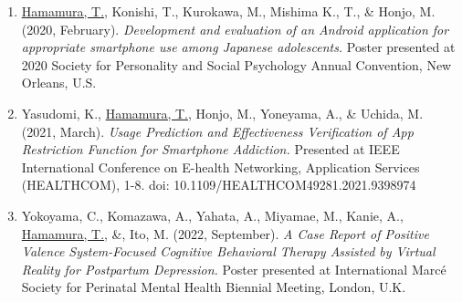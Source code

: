 \documentclass[11pt,a4paper]{article}
\begin{document}
\begin{enumerate}
	\item \underline{Hamamura, T.}, Konishi, T., Kurokawa, M., Mishima K., T., \& Honjo, M. (2020, February). \textit{Development and evaluation of an Android application for appropriate smartphone use among Japanese adolescents.} Poster presented at 2020 Society for Personality and Social Psychology Annual Convention, New Orleans, U.S.
	\item Yasudomi, K., \underline{Hamamura, T.}, Honjo, M., Yoneyama, A., \& Uchida, M. (2021, March). \textit{Usage Prediction and Effectiveness Verification of App Restriction Function for Smartphone Addiction.} Presented at IEEE International Conference on E-health Networking, Application Services (HEALTHCOM), 1-8. doi: 10.1109/HEALTHCOM49281.2021.9398974
	\item Yokoyama, C., Komazawa, A., Yahata, A., Miyamae, M., Kanie, A., \underline{Hamamura, T.}, \&, Ito, M. (2022, September). \textit{A Case Report of Positive Valence System-Focused Cognitive Behavioral Therapy Assisted by Virtual Reality for Postpartum Depression.} Poster presented at International Marc\'e Society for Perinatal Mental Health Biennial Meeting, London, U.K.
\end{enumerate}
\end{document}
